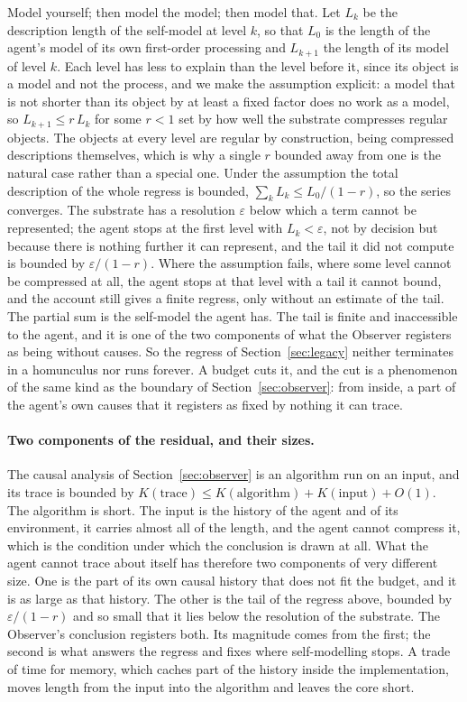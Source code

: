 Model yourself; then model the model; then model that. Let $L_k$ be the description length of the
self-model at level $k$, so that $L_0$ is the length of the agent's model of its own first-order
processing and $L_{k+1}$ the length of its model of level $k$. Each level has less to explain than the
level before it, since its object is a model and not the process, and we make the assumption explicit:
a model that is not shorter than its object by at least a fixed factor does no work as a model, so
$L_{k+1} \le r\,L_k$ for some $r<1$ set by how well the substrate compresses regular objects. The
objects at every level are regular by construction, being compressed descriptions themselves, which is
why a single $r$ bounded away from one is the natural case rather than a special one. Under the
assumption the total description of the whole regress is bounded, $\sum_k L_k \le L_0/(1-r)$, so the
series converges. The substrate has a resolution $\varepsilon$ below which a term cannot be
represented; the agent stops at the first level with $L_k < \varepsilon$, not by decision but because
there is nothing further it can represent, and the tail it did not compute is bounded by
$\varepsilon/(1-r)$. Where the assumption fails, where some level cannot be compressed at all, the
agent stops at that level with a tail it cannot bound, and the account still gives a finite regress,
only without an estimate of the tail. The partial sum is the self-model the agent has. The tail is
finite and inaccessible to the agent, and it is one of the two components of what the Observer
registers as being without causes. So the regress of Section~\ref{sec:legacy} neither terminates in a
homunculus nor runs forever. A budget cuts it, and the cut is a phenomenon of the same kind as the
boundary of Section~\ref{sec:observer}: from inside, a part of the agent's own causes that it registers
as fixed by nothing it can trace.

\paragraph{Two components of the residual, and their sizes.}
\label{sec:components}
The causal analysis of Section~\ref{sec:observer} is an algorithm run on an input, and its trace is
bounded by $K(\mathrm{trace}) \le K(\mathrm{algorithm}) + K(\mathrm{input}) + O(1)$. The algorithm is
short. The input is the history of the agent and of its environment, it carries almost all of the
length, and the agent cannot compress it, which is the condition under which the conclusion is drawn at
all. What the agent cannot trace about itself has therefore two components of very different size. One
is the part of its own causal history that does not fit the budget, and it is as large as that history.
The other is the tail of the regress above, bounded by $\varepsilon/(1-r)$ and so small that it lies
below the resolution of the substrate. The Observer's conclusion registers both. Its magnitude comes
from the first; the second is what answers the regress and fixes where self-modelling stops. A trade of
time for memory, which caches part of the history inside the implementation, moves length from the
input into the algorithm and leaves the core short.

